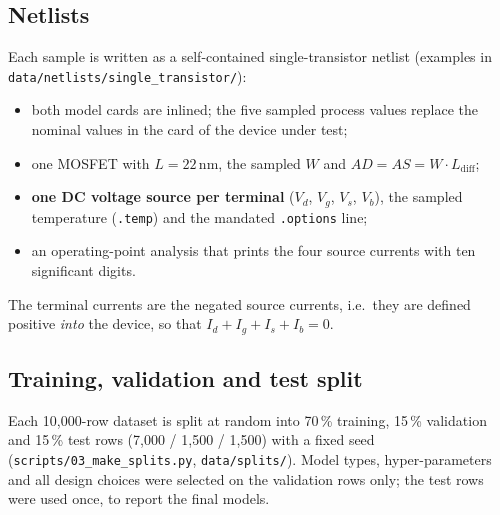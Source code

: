 \subsection{Netlists}
Each sample is written as a self-contained single-transistor netlist (examples in \texttt{data/netlists/\allowbreak single\_transistor/}):
\begin{itemize}
  \item both model cards are inlined; the five sampled process values replace the nominal values in the card of the device under test;
  \item one MOSFET with $L=22\,\mathrm{nm}$, the sampled $W$ and $AD=AS=W\cdot L_{\mathrm{diff}}$;
  \item \textbf{one DC voltage source per terminal} ($V_d$, $V_g$, $V_s$, $V_b$), the sampled temperature (\texttt{.temp}) and the mandated
        \texttt{.options} line;
  \item an operating-point analysis that prints the four source currents with ten significant digits.
\end{itemize}
The terminal currents are the negated source currents, i.e.\ they are defined positive \emph{into} the device, so that $I_d+I_g+I_s+I_b=0$.

\subsection{Training, validation and test split}
Each 10{,}000-row dataset is split at random into 70\,\% training, 15\,\% validation and 15\,\% test rows (7{,}000 / 1{,}500 / 1{,}500) with a fixed
seed (\texttt{scripts/03\_make\_splits.py}, \texttt{data/splits/}). Model types, hyper-parameters and all design choices were selected on the validation
rows only; the test rows were used once, to report the final models.

